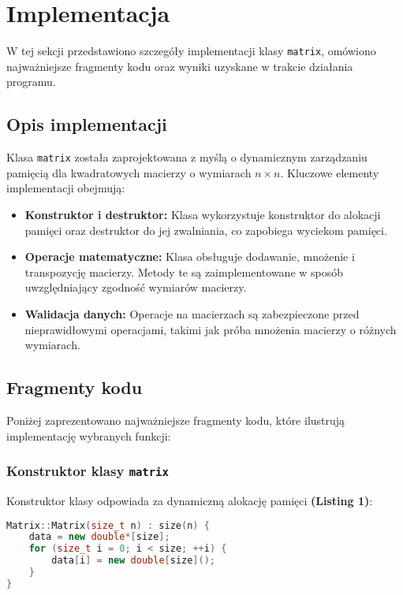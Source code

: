 \newpage
\section{Implementacja}		%
W tej sekcji przedstawiono szczegóły implementacji klasy \texttt{matrix}, omówiono najważniejsze fragmenty kodu oraz wyniki uzyskane w trakcie działania programu.

\subsection{Opis implementacji}
Klasa \texttt{matrix} została zaprojektowana z myślą o dynamicznym zarządzaniu pamięcią dla kwadratowych macierzy o wymiarach \(n \times n\). Kluczowe elementy implementacji obejmują:
\begin{itemize}
  \item \textbf{Konstruktor i destruktor:}
        Klasa wykorzystuje konstruktor do alokacji pamięci oraz destruktor do jej zwalniania, co zapobiega wyciekom pamięci.
  \item \textbf{Operacje matematyczne:}
        Klasa obsługuje dodawanie, mnożenie i transpozycję macierzy. Metody te są zaimplementowane w sposób uwzględniający zgodność wymiarów macierzy.
  \item \textbf{Walidacja danych:}
        Operacje na macierzach są zabezpieczone przed nieprawidłowymi operacjami, takimi jak próba mnożenia macierzy o różnych wymiarach.
\end{itemize}

\subsection{Fragmenty kodu}
Poniżej zaprezentowano najważniejsze fragmenty kodu, które ilustrują implementację wybranych funkcji:

\subsubsection{Konstruktor klasy \texttt{matrix}}
Konstruktor klasy odpowiada za dynamiczną alokację pamięci \textbf{(Listing 1)}:
\begin{lstlisting}[language=C++, caption={Konstuktor klasy}, label={lst:operator}]
Matrix::Matrix(size_t n) : size(n) {
    data = new double*[size];
    for (size_t i = 0; i < size; ++i) {
        data[i] = new double[size]();
    }
}
\end{lstlisting}

